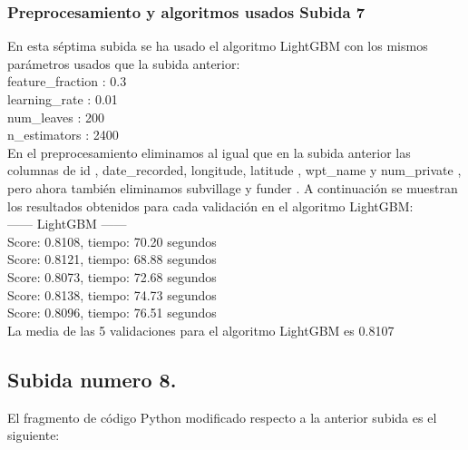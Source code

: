 	
	\subsubsection[Preprocesamiento y algoritmos usados Subida 7]{Preprocesamiento y algoritmos usados Subida 7}
	
	En esta séptima subida se ha usado el algoritmo LightGBM con los mismos
	parámetros usados que la subida anterior: \\
	
	feature\_fraction : 0.3 \\
	learning\_rate : 0.01 \\
	num\_leaves : 200 \\
	n\_estimators : 2400 \\
	
	En el preprocesamiento eliminamos al igual que en la subida anterior las columnas de id , date\_recorded,
	longitude, latitude , wpt\_name y num\_private , pero ahora también eliminamos subvillage
	y funder . A continuación se muestran los resultados 
	obtenidos para cada validación en el algoritmo LightGBM: \\

	------ LightGBM ------\\
	Score: 0.8108, tiempo:  70.20 segundos\\
	Score: 0.8121, tiempo:  68.88 segundos\\
	Score: 0.8073, tiempo:  72.68 segundos\\
	Score: 0.8138, tiempo:  74.73 segundos\\
	Score: 0.8096, tiempo:  76.51 segundos\\
	
	La media de las 5 validaciones para el algoritmo LightGBM es 0.8107 \\

	
	\subsection[Subida numero 8]{Subida numero 8.}
	
	El fragmento de código Python modificado respecto a la anterior subida es el siguiente:
	
